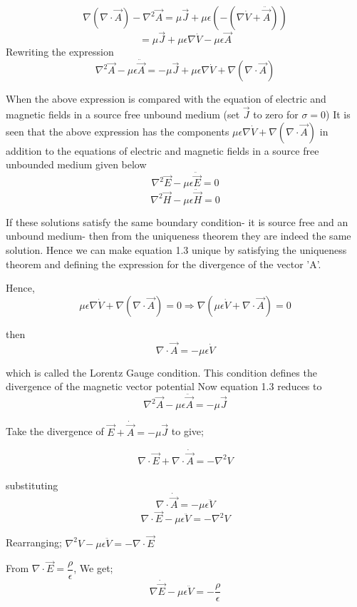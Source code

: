 $$\nabla(\nabla\cdot\vec{A}) -\nabla^{2}\vec{A}=\mu\vec{J}+\mu\epsilon(-(\nabla\dot{V}+\ddot{\vec{A}}))$$
$$=\mu\vec{J}+\mu\epsilon\nabla\dot{V}-\mu\epsilon\vec{A}$$ 
Rewriting the expression
\begin{equation}
\nabla^{2}\vec{A}-\mu\epsilon\ddot{\vec{A}}=-\mu\vec{J}+\mu\epsilon\nabla\dot{V}+\nabla(\nabla\cdot\vec{A})
\end{equation}


When the above expression is compared with the equation of electric and magnetic fields in a source free unbound medium (set $\vec{J}$ to zero for $\sigma=0$) It is seen that the above expression has the components $\mu\epsilon\nabla\dot{V}+\nabla(\nabla\cdot\vec{A})$ in addition to the equations of electric and magnetic fields in a source free unbounded medium given below
$$\nabla^{2}\vec{E}-\mu\epsilon\ddot{\vec{E}}=0$$
$$\nabla^{2}\vec{H}-\mu\epsilon\ddot{\vec{H}}=0$$


If these solutions satisfy the same boundary condition- it is source free and an unbound medium- then from the uniqueness theorem they are indeed the same solution. Hence we can make equation 1.3 unique by satisfying the uniqueness theorem and defining the expression for the divergence of the vector 'A'.

Hence, \begin{equation}
\mu\epsilon\nabla\dot{V}+\nabla(\nabla\cdot\vec{A})=0 \Rightarrow \nabla(\mu\epsilon\dot{V}+\nabla\cdot\vec{A})=0
\end{equation}

then
$$\nabla\cdot\vec{A}=-\mu\epsilon\dot{V}$$

which is called the Lorentz Gauge condition.
This condition defines the divergence of the magnetic vector potential
Now equation 1.3 reduces to
\begin{equation}
\nabla^{2}\vec{A}-\mu\epsilon\ddot{\vec{A}}=-\mu\vec{J}
\end{equation} 


Take the divergence of $\vec{E}+\dot{\vec{A}}=-\mu\vec{J}$ to give;

$$\nabla\cdot\vec{E}+\nabla\cdot\dot{\vec{A}}=-\nabla^{2} V$$\\
substituting	
$$\nabla\cdotp\dot{\vec{A}}=-\mu\epsilon\ddot{V}$$
$$\nabla\cdotp\vec{E}-\mu\epsilon\ddot{V}=-\nabla^{2} V$$

Rearranging; $\nabla^{2} V-\mu\epsilon\ddot{V}=-\nabla\cdotp\vec{E}$

From $\nabla\cdotp\vec{E}=\dfrac{\rho}{\epsilon}$, We get;
\begin{equation}
\nabla\dot\vec{E}-\mu\epsilon\ddot{V}=-\dfrac{\rho}{\epsilon}
\end{equation}

